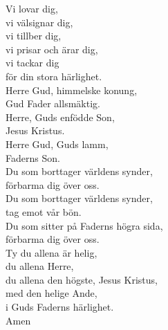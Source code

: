 \begin{multicols}{2}
\vspace{-12.5 mm}

Vi lovar dig,\\
vi välsignar dig,\\ 
vi tillber dig,\\ 
vi prisar och ärar dig,\\ 
vi tackar dig \\
för din stora härlighet.\\
Herre Gud, himmelske konung,\\ 
Gud Fader allsmäktig.\\ Herre, Guds enfödde Son,\\
Jesus Kristus.\\
Herre Gud, Guds lamm,\\
Faderns Son. \\
Du som borttager världens synder,\\
förbarma dig över oss.\\
Du som borttager världens synder, \\
tag emot vår bön.\\
Du som sitter på Faderns högra sida, \\
förbarma dig över oss.\\
Ty du allena är helig, \\
du allena Herre,\\
du allena den högste, Jesus Kristus, \\
med den helige Ande,\\
i Guds Faderns härlighet.\\
Amen
\end{multicols}